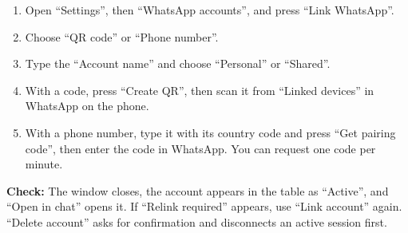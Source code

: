 \begin{enumerate}
\item Open “Settings”, then “WhatsApp accounts”, and press “Link WhatsApp”.
\item Choose “QR code” or “Phone number”.
\item Type the “Account name” and choose “Personal” or “Shared”.
\item With a code, press “Create QR”, then scan it from “Linked devices” in WhatsApp on the phone.
\item With a phone number, type it with its country code and press “Get pairing code”, then enter the code in WhatsApp. You can request one code per minute.
\end{enumerate}

\textbf{Check:} The window closes, the account appears in the table as “Active”, and “Open in chat” opens it. If “Relink required” appears, use “Link account” again. “Delete account” asks for confirmation and disconnects an active session first.
